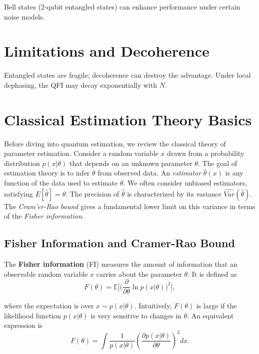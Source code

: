 Bell states (2-qubit entangled states) can enhance performance under
certain noise models.

\section{Limitations and Decoherence}

Entangled states are fragile; decoherence can destroy the
advantage. Under local dephasing, the QFI may decay exponentially with
$N$.




\section{Classical Estimation Theory Basics}

\label{sec:classical}



Before diving into quantum estimation, we review the classical theory
of parameter estimation. Consider a random variable $x$ drawn from a
probability distribution $p(x|\theta)$ that depends on an unknown
parameter $\theta$. The goal of estimation theory is to infer $\theta$
from observed data. An \textit{estimator} $\hat{\theta}(x)$ is any
function of the data used to estimate $\theta$. We often consider
unbiased estimators, satisfying $E[\hat{\theta}] = \theta$. The
precision of $\hat{\theta}$ is characterized by its variance
$\widehat{Var}(\hat{\theta})$. The \textit{Cram'er-Rao bound} gives a
fundamental lower limit on this variance in terms of the
\textit{Fisher information}.



\subsection{Fisher Information and Cramer-Rao Bound}



The \textbf{Fisher information} (FI) measures the amount of
information that an observable random variable $x$ carries about the
parameter $\theta$. It is defined as
\begin{equation}
F(\theta)=\mathbb{E}\Bigg[\Big(\frac{\partial}{\partial \theta}\ln p(x|\theta)\Big)^2\Bigg],
\label{eq:FI-def}
\end{equation}

where the expectation is over $x\sim p(x|\theta)$. Intuitively,
$F(\theta)$ is large if the likelihood function $p(x|\theta)$ is very
sensitive to changes in $\theta$. An equivalent expression is
\[
F(\theta)=\int \frac{1}{p(x|\theta)}\left(\frac{\partial p(x|\theta)}{\partial \theta}\right)^2 dx.
\]


